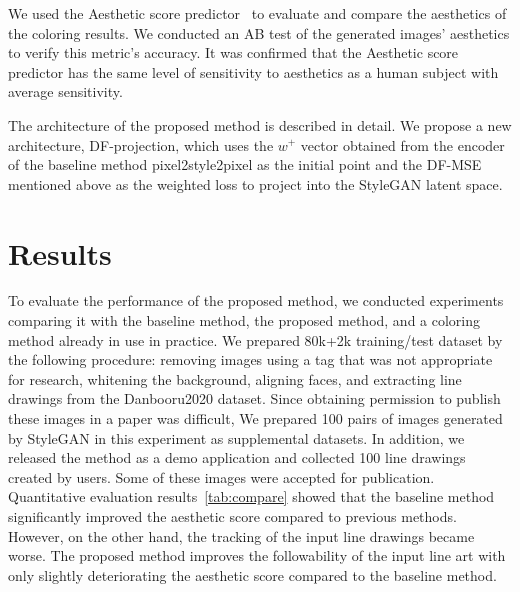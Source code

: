 \documentclass[a4paper]{article}
\newcommand{\aftersection}{\vspace{-5pt}}
\newcommand{\beforesection}{\vspace{-10pt}}
\begin{document}
\begin{multicols}{2}
We used the Aesthetic score predictor~\cite{aes} to evaluate and compare the aesthetics of the coloring results. We conducted an AB test of the generated images' aesthetics to verify this metric's accuracy. It was confirmed that the Aesthetic score predictor has the same level of sensitivity to aesthetics as a human subject with average sensitivity.

The architecture of the proposed method is described in detail. We propose a new architecture, DF-projection, which uses the $w^+$ vector obtained from the encoder of the baseline method pixel2style2pixel as the initial point and the DF-MSE mentioned above as the weighted loss to project into the StyleGAN latent space.

\beforesection
\section*{Results}
\aftersection

To evaluate the performance of the proposed method, we conducted experiments comparing it with the baseline method, the proposed method, and a coloring method already in use in practice.
We prepared 80k+2k training/test dataset by the following procedure: removing images using a tag that was not appropriate for research, whitening the background, aligning faces, and extracting line drawings from the Danbooru2020 dataset. Since obtaining permission to publish these images in a paper was difficult, We prepared 100 pairs of images generated by StyleGAN in this experiment as supplemental datasets. In addition, we released the method as a demo application and collected 100 line drawings created by users. Some of these images were accepted for publication.
Quantitative evaluation results~\ref{tab:compare} showed that the baseline method significantly improved the aesthetic score compared to previous methods. However, on the other hand, the tracking of the input line drawings became worse. The proposed method improves the followability of the input line art with only slightly deteriorating the aesthetic score compared to the baseline method.

\beforesection

\end{multicols}
\end{document}
